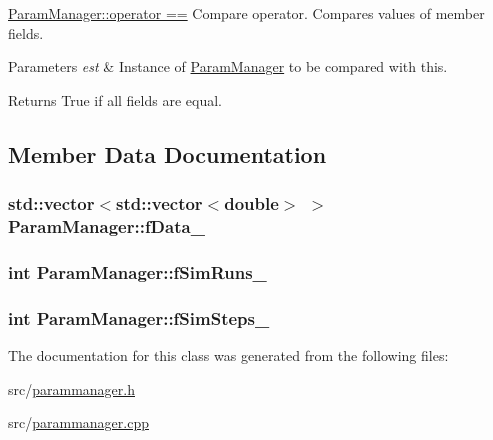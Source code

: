 \hyperlink{classParamManager_abcaeb584edbc8949339f3a71f0cae3ce}{Param\+Manager\+::operator ==} Compare operator. Compares values of member fields. 


\begin{DoxyParams}{Parameters}
{\em est} & Instance of \hyperlink{classParamManager}{Param\+Manager} to be compared with this. \\
\hline
\end{DoxyParams}
\begin{DoxyReturn}{Returns}
True if all fields are equal. 
\end{DoxyReturn}


\subsection{Member Data Documentation}
\subsubsection[{\texorpdfstring{f\+Data\+\_\+}{fData_}}]{\setlength{\rightskip}{0pt plus 5cm}std\+::vector$<$std\+::vector$<$double$>$ $>$ Param\+Manager\+::f\+Data\+\_\+\hspace{0.3cm}{\ttfamily [private]}}\hypertarget{classParamManager_a50cc8e69bb08c7f0b32d7614d5ade323}{}\label{classParamManager_a50cc8e69bb08c7f0b32d7614d5ade323}
\subsubsection[{\texorpdfstring{f\+Sim\+Runs\+\_\+}{fSimRuns_}}]{\setlength{\rightskip}{0pt plus 5cm}int Param\+Manager\+::f\+Sim\+Runs\+\_\+\hspace{0.3cm}{\ttfamily [private]}}\hypertarget{classParamManager_a3f867447d92ddea2da69014308ad0d16}{}\label{classParamManager_a3f867447d92ddea2da69014308ad0d16}
\subsubsection[{\texorpdfstring{f\+Sim\+Steps\+\_\+}{fSimSteps_}}]{\setlength{\rightskip}{0pt plus 5cm}int Param\+Manager\+::f\+Sim\+Steps\+\_\+\hspace{0.3cm}{\ttfamily [private]}}\hypertarget{classParamManager_a6020a91cb4adc8f9dcd6647353840599}{}\label{classParamManager_a6020a91cb4adc8f9dcd6647353840599}


The documentation for this class was generated from the following files\+:\begin{DoxyCompactItemize}
\item 
src/\hyperlink{parammanager_8h}{parammanager.\+h}\item 
src/\hyperlink{parammanager_8cpp}{parammanager.\+cpp}\end{DoxyCompactItemize}
